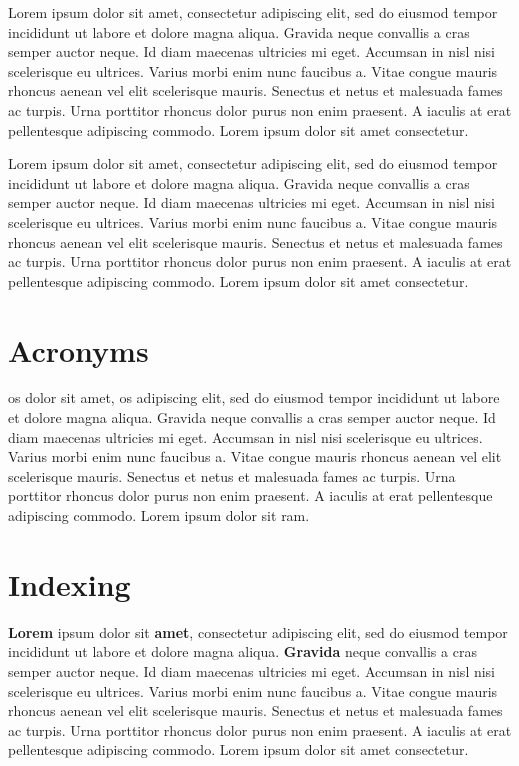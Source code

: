 \documentclass[a4paper, 12pt]{report}
\begin{document}
Lorem ipsum dolor sit amet, consectetur adipiscing elit, sed do eiusmod tempor incididunt ut labore et dolore magna aliqua. Gravida neque convallis a cras semper auctor neque. Id diam maecenas ultricies mi eget. Accumsan in nisl nisi scelerisque eu ultrices. Varius morbi enim nunc faucibus a. Vitae congue mauris rhoncus aenean vel elit scelerisque mauris. Senectus et netus et malesuada fames ac turpis. Urna porttitor rhoncus dolor purus non enim praesent. A iaculis at erat pellentesque adipiscing commodo. Lorem ipsum dolor sit amet consectetur. \citep{microservices_book}

Lorem ipsum dolor sit amet, consectetur adipiscing elit, sed do eiusmod tempor incididunt ut labore et dolore magna aliqua. Gravida neque convallis a cras semper auctor neque. Id diam maecenas ultricies mi eget. Accumsan in nisl nisi scelerisque eu ultrices. Varius morbi enim nunc faucibus a. Vitae congue mauris rhoncus aenean vel elit scelerisque mauris. Senectus et netus et malesuada fames ac turpis. Urna porttitor rhoncus dolor purus non enim praesent. A iaculis at erat pellentesque adipiscing commodo. Lorem ipsum dolor sit amet consectetur. \citep{google}



\chapter{Acronyms}
\acrfull{os} dolor sit amet, \acrshort{os} adipiscing elit, sed do eiusmod tempor incididunt ut labore et dolore magna aliqua. Gravida neque convallis a cras semper auctor neque. Id diam maecenas ultricies mi eget. Accumsan in nisl nisi scelerisque eu ultrices. Varius morbi enim nunc faucibus a. Vitae congue mauris rhoncus aenean vel elit scelerisque mauris. Senectus et netus et malesuada fames ac turpis. Urna porttitor rhoncus dolor purus non enim praesent. A iaculis at erat pellentesque adipiscing commodo. Lorem ipsum dolor sit \acrfull{ram}.



\chapter{Indexing}
\textbf{Lorem} ipsum dolor sit \textbf{amet}, consectetur adipiscing elit, sed do eiusmod tempor incididunt ut labore et dolore magna aliqua. \textbf{Gravida} neque convallis a cras semper auctor neque. Id diam maecenas ultricies mi eget. Accumsan in nisl nisi scelerisque eu ultrices. Varius morbi enim nunc faucibus a. Vitae congue mauris rhoncus aenean vel elit scelerisque mauris. Senectus et netus et malesuada fames ac turpis. Urna porttitor rhoncus dolor purus non enim praesent. A iaculis at erat pellentesque adipiscing commodo. Lorem ipsum dolor sit amet consectetur.






\printindex
\end{document}

